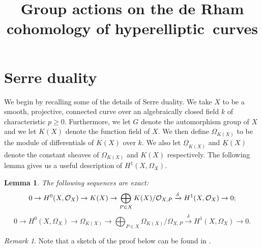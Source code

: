 \documentclass[11pt]{article} %
\title{Group actions on the de Rham cohomology of hyperelliptic~curves}
\author{}
\theoremstyle{plain}
\newtheorem{lem}[defn]{Lemma}
\theoremstyle{remark}
\newtheorem*{rem}{Remark}
\newcommand{\cO}{{\cal O}}
\newcommand{\ra}{\rightarrow}
\newcommand{\hzero}{{H^0(X,\Omega_X)}}
\newcommand{\hone}{H^1(X,\mathcal{O}_X)}
\begin{document}
\maketitle

\listoftodos


\section{Serre duality}


We begin by recalling some of the details of Serre duality.
We take $X$ to be a smooth, projective, connected curve over an algebraically closed field $k$ of characteristic $p \geq 0$.
Furthermore, we let $G$ denote the automorphism group of $X$ and we let $K(X)$ denote the function field of $X$.
We then define $\Omega_{K(X)}$ to be the module of differentials of $K(X)$ over $k$.
We also let $\underline{\Omega}_{K(X)}$ and $\underline{K}(X)$ denote the constant sheaves of $\Omega_{K(X)}$ and $K(X)$ respectively.
The following lemma gives us a useful description of $H^1(X,\Omega_X)$.
\begin{lem}\label{exactsequencelemma}
The following sequences are exact:
\begin{equation}\label{dualitysesfunctions}
0 \ra H^0(X,\cO_X) \ra K(X) \ra \bigoplus_{P \in X} K(X)/\cO_{X,P} \xrightarrow{\delta} \hone \ra  0;
\end{equation}
\begin{equation}\label{dualitysesdifferentials}
0 \rightarrow \hzero \ra \Omega_{K(X)} \ra \bigoplus_{P \in X}\Omega_{K(X)}/\Omega_{X,P} \xrightarrow{\delta} H^1(X,\Omega_X) \ra 0.
\end{equation}
\end{lem}
\begin{rem}
Note that a sketch of the proof below can be found in \cite[Pg. 248]{hart}.
\end{rem}
\end{document}
